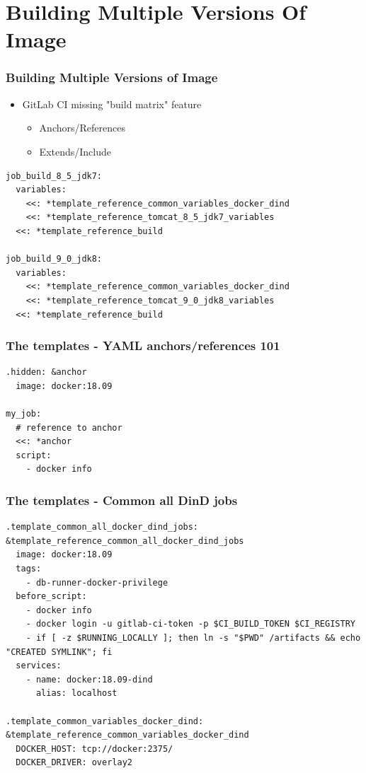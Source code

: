 \documentclass[14pt,aspectratio=169]{beamer}
\begin{document}
\section{Building Multiple Versions Of Image}

\begin{frame}[fragile]
  \frametitle{Building Multiple Versions of Image}
  \begin{itemize}
    \item GitLab CI missing "build matrix" feature
    \begin{itemize}
      \item Anchors/References
      \item Extends/Include
    \end{itemize}
  \end{itemize}
  \begin{verbatim}
job_build_8_5_jdk7:
  variables:
    <<: *template_reference_common_variables_docker_dind
    <<: *template_reference_tomcat_8_5_jdk7_variables
  <<: *template_reference_build

job_build_9_0_jdk8:
  variables:
    <<: *template_reference_common_variables_docker_dind
    <<: *template_reference_tomcat_9_0_jdk8_variables
  <<: *template_reference_build
  \end{verbatim}
\end{frame}

\begin{frame}[fragile]
  \frametitle{The templates - YAML anchors/references 101}
  \begin{verbatim}
.hidden: &anchor
  image: docker:18.09

my_job:
  # reference to anchor
  <<: *anchor
  script:
    - docker info
  \end{verbatim}
\end{frame}

\begin{frame}[fragile]
  \frametitle{The templates - Common all DinD jobs}
  \begin{verbatim}
.template_common_all_docker_dind_jobs: &template_reference_common_all_docker_dind_jobs
  image: docker:18.09
  tags:
    - db-runner-docker-privilege
  before_script:
    - docker info
    - docker login -u gitlab-ci-token -p $CI_BUILD_TOKEN $CI_REGISTRY
    - if [ -z $RUNNING_LOCALLY ]; then ln -s "$PWD" /artifacts && echo "CREATED SYMLINK"; fi
  services:
    - name: docker:18.09-dind
      alias: localhost

.template_common_variables_docker_dind: &template_reference_common_variables_docker_dind
  DOCKER_HOST: tcp://docker:2375/
  DOCKER_DRIVER: overlay2
  \end{verbatim}
\end{frame}
\end{document}
